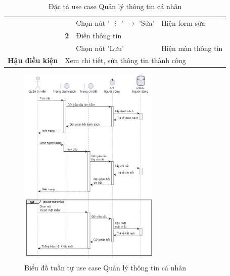 \documentclass[../DoAn.tex]{subfiles}
\begin{document}
\begin{table}[H]
\begin{tabular}{|l|c|l|l|}
                                                & \multirow{3}{*}{\textbf{2}}                                      & Chọn nút ' \vdots{} ' $\rightarrow$ 'Sửa' & Hiện form sửa                                   \\ \cline{3-4}
                                                &                                                                  & Điền thông tin                            &                                                 \\
                                                &                                                                  & Chọn nút 'Lưu'                            & Hiện màn thông tin                              \\ \hline
        \textbf{Hậu điều kiện}                  & \multicolumn{3}{l|}{Xem chi tiết, sửa thông tin thành công}                                                                                                    \\ \hline
    \end{tabular}
    \caption{Đặc tả use case Quản lý thông tin cá nhân}
    \label{table:uc-user-memanage}
\end{table}
\begin{figure}[H]
    \centering
    \includegraphics[width=0.6\textwidth]{Hinhve/sequences/UserMeManage.png}
    \caption{Biểu đồ tuần tự use case Quản lý thông tin cá nhân}
    \label{figure:sd-user-memanage}
\end{figure}
\break
\end{document}
